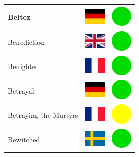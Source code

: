 \documentclass[12pt, a4paper, twoside]{report}
\begin{document}
\begin{center}
\begin{longtable}{|p{5cm}|p{2cm}|p{2cm}|}
 Beltez                                                     & \includegraphics[width=1cm]{../4x3/de} &   \includegraphics[width=1cm]{../likes/y} \\ \hline
 Benediction                                                & \includegraphics[width=1cm]{../4x3/gb} &   \includegraphics[width=1cm]{../likes/y} \\ \hline
 Benighted                                                  & \includegraphics[width=1cm]{../4x3/fr} &   \includegraphics[width=1cm]{../likes/y} \\ \hline
 Betrayal                                                   & \includegraphics[width=1cm]{../4x3/de} &   \includegraphics[width=1cm]{../likes/y} \\ \hline
 Betraying the Martyrs                                      & \includegraphics[width=1cm]{../4x3/fr} &   \includegraphics[width=1cm]{../likes/m} \\ \hline
 Bewitched                                                  & \includegraphics[width=1cm]{../4x3/se} &   \includegraphics[width=1cm]{../likes/y} \\ \hline

\end{longtable}
\end{center}
\end{document}
